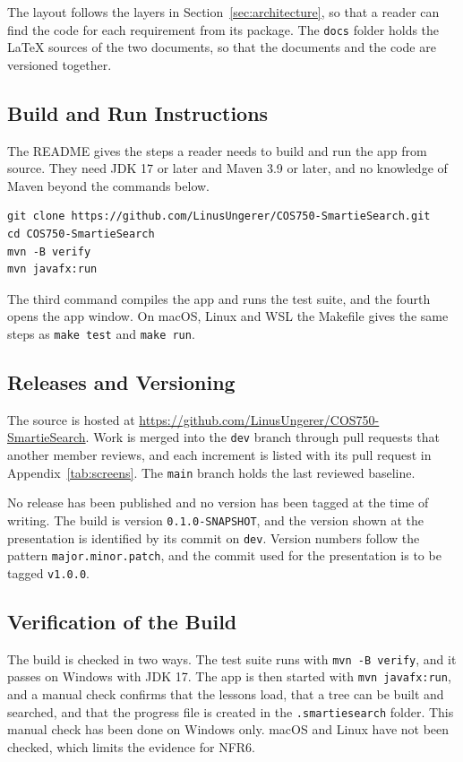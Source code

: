 The layout follows the layers in Section~\ref{sec:architecture}, so that a reader can find the code for each requirement from its package. The \texttt{docs} folder holds the LaTeX sources of the two documents, so that the documents and the code are versioned together.

\subsection{Build and Run Instructions}
The README gives the steps a reader needs to build and run the app from source. They need JDK 17 or later and Maven 3.9 or later, and no knowledge of Maven beyond the commands below.

\begin{lstlisting}
git clone https://github.com/LinusUngerer/COS750-SmartieSearch.git
cd COS750-SmartieSearch
mvn -B verify
mvn javafx:run
\end{lstlisting}

The third command compiles the app and runs the test suite, and the fourth opens the app window. On macOS, Linux and WSL the Makefile gives the same steps as \texttt{make test} and \texttt{make run}.

\subsection{Releases and Versioning}
The source is hosted at \url{https://github.com/LinusUngerer/COS750-SmartieSearch}. Work is merged into the \texttt{dev} branch through pull requests that another member reviews, and each increment is listed with its pull request in Appendix~\ref{tab:screens}. The \texttt{main} branch holds the last reviewed baseline.

No release has been published and no version has been tagged at the time of writing. The build is version \texttt{0.1.0-SNAPSHOT}, and the version shown at the presentation is identified by its commit on \texttt{dev}. Version numbers follow the pattern \texttt{major.minor.patch}, and the commit used for the presentation is to be tagged \texttt{v1.0.0}.

\subsection{Verification of the Build}
The build is checked in two ways. The test suite runs with \texttt{mvn -B verify}, and it passes on Windows with JDK 17. The app is then started with \texttt{mvn javafx:run}, and a manual check confirms that the lessons load, that a tree can be built and searched, and that the progress file is created in the \texttt{.smartiesearch} folder. This manual check has been done on Windows only. macOS and Linux have not been checked, which limits the evidence for NFR6.